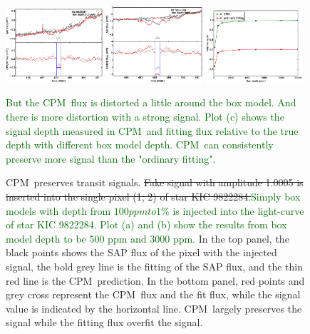 \documentclass[12pt, preprint]{aastex}
\newcommand{\name}{CPM}
\newcommand{\revise}[1]{\textcolor{darkgreen}{#1}}
\newcommand{\remove}[1]{\sout{#1}}
\begin{document}
\begin{figure}[p]
\begin{center}
\includegraphics[width=0.32\textwidth]{f4a}
\includegraphics[width=0.32\textwidth]{f4b}
\includegraphics[width=0.32\textwidth]{f4c}
\end{center}
\caption{
  \label{distortion} 
  \name\ preserves transit signals.
  \remove{Fake signal with amplitude 1.0005 is inserted into the single pixel (1, 2) of star KIC 9822284.}\revise{Simply box models with depth from $100 ppm to 1\%$ is injected into the light-curve of star KIC 9822284. Plot (a) and (b) show the results from box model depth to be 500 ppm and 3000 ppm.}
  In the top panel, the black points shows the SAP flux of the pixel with the injected signal, the bold grey line is the fitting of the SAP flux, and the thin red line is the \name\ prediction. 
  In the bottom panel, red points and grey cross represent the \name\ flux and the fit flux, while the signal value is indicated by the horizontal line. 
  \name\ largely preserves the signal while the fitting flux overfit the signal.} 
  \revise{But the \name\ flux is distorted a little around the box model. 
  And there is more distortion with a strong signal.
  Plot (c) shows the signal depth measured in \name\ and fitting flux relative to the true depth with different box model depth. \name\ can consistently preserve more signal than the "ordinary fitting".}
\end{figure}
\end{document}
